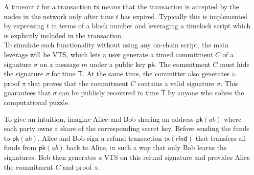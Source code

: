 \documentclass{article}      	%
\begin{document}
A timeout $t$ for a transaction $\mathsf{tx}$ means that the transaction is accepted by the nodes in the network only after time $t$ has expired. Typically this is implemented by expressing $t$ in terms of a block number and leveraging a timelock script which is explicitly included in the transaction. \\

To simulate  such functionality without using any on-chain script, the main leverage will be VTS, which lets a user generate a timed commitment $C$ of a signature $\sigma$ on a message $m$ under a public key $\mathsf{pk}$. The commitment $C $ must hide the signature $\sigma$ for time $\mathsf{T}$. At the same time, the committer also generates a proof $\pi$ that proves that the commitment $C$ contains a valid signature $\sigma$. This guarantees that $\sigma$ can be publicly recovered in time $\mathsf{T}$ by anyone who solves the computational puzzle.

To give an intuition, imagine Alice and Bob sharing an address $\mathsf{pk}(ab)$ where each party owns a share of the corresponding secret key.  Before sending the funds to $\mathsf{pk}(ab)$, Alice and Bob sign a refund transaction $\mathsf{tx}(\mathsf{rfnd})$ that transfers all funds from $\mathsf{pk}(ab)$ back to Alice, in such a way that only Bob learns the signatures. Bob then generates a VTS on this refund signature and provides Alice the commitment $C$ and proof $\pi$. \\
\end{document}
